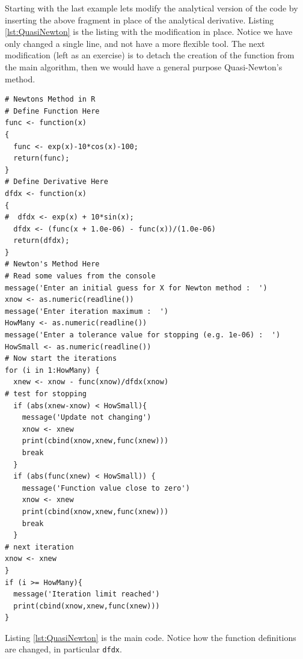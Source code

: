 Starting with the last example lets modify the analytical version of the code by inserting the above fragment in place of the analytical derivative.  Listing \ref{lst:QuasiNewton} is the listing with the modification in place.  Notice we have only changed a single line, and not have a more flexible tool.  The next modification (left as an exercise) is to detach the creation of the function from the main algorithm, then we would have a general purpose Quasi-Newton's method.

\begin{lstlisting}[caption=R code demonstrating Newton's Method calculations using finite-difference approximation for the derivative, label=lst:QuasiNewton]
# Newtons Method in R
# Define Function Here
func <- function(x)
{
  func <- exp(x)-10*cos(x)-100;
  return(func);
}
# Define Derivative Here
dfdx <- function(x)
{
#  dfdx <- exp(x) + 10*sin(x); 
  dfdx <- (func(x + 1.0e-06) - func(x))/(1.0e-06)
  return(dfdx);
}
# Newton's Method Here
# Read some values from the console
message('Enter an initial guess for X for Newton method :  ')
xnow <- as.numeric(readline())
message('Enter iteration maximum :  ')
HowMany <- as.numeric(readline())
message('Enter a tolerance value for stopping (e.g. 1e-06) :  ')
HowSmall <- as.numeric(readline())
# Now start the iterations
for (i in 1:HowMany) {
  xnew <- xnow - func(xnow)/dfdx(xnow)
# test for stopping
  if (abs(xnew-xnow) < HowSmall){
    message('Update not changing')
    xnow <- xnew
    print(cbind(xnow,xnew,func(xnew)))
    break
  }
  if (abs(func(xnew) < HowSmall)) {
    message('Function value close to zero')
    xnow <- xnew
    print(cbind(xnow,xnew,func(xnew)))
    break    
  }
# next iteration
xnow <- xnew
}
if (i >= HowMany){
  message('Iteration limit reached')
  print(cbind(xnow,xnew,func(xnew)))
}
\end{lstlisting}



Listing \ref{lst:QuasiNewton} is the main code.  Notice how the function definitions are changed, in particular \texttt{dfdx}.



